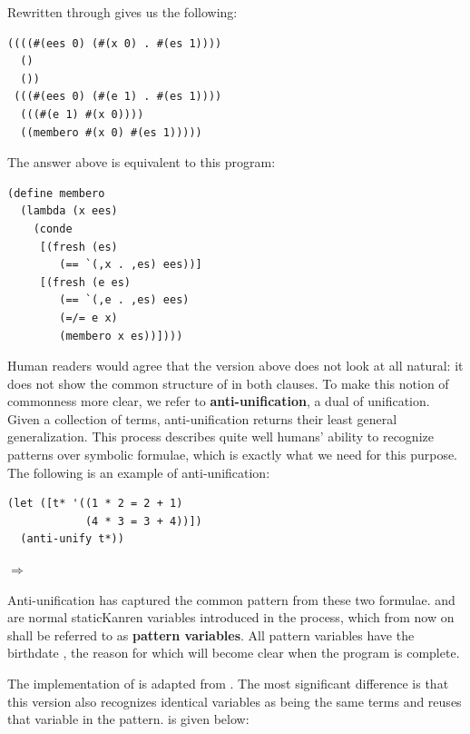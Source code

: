 Rewritten through  gives us the following:
\begin{lstlisting}
((((#(ees 0) (#(x 0) . #(es 1)))) 
  ()
  ())
 (((#(ees 0) (#(e 1) . #(es 1))))
  (((#(e 1) #(x 0))))
  ((membero #(x 0) #(es 1)))))
\end{lstlisting}
The answer above is equivalent to this program:
\begin{lstlisting}
(define membero
  (lambda (x ees)
    (conde
     [(fresh (es)
        (== `(,x . ,es) ees))]
     [(fresh (e es)
        (== `(,e . ,es) ees)
        (=/= e x)
        (membero x es))])))
\end{lstlisting}
Human readers would agree that the version above does not look at all natural: it does not show the common structure of  in both clauses. To make this notion of commonness more clear, we refer to \textbf{anti-unification}, a dual of unification. Given a collection of terms, anti-unification returns their least general generalization. This process describes quite well humans' ability to recognize patterns over symbolic formulae, which is exactly what we need for this purpose. The following is an example of anti-unification:
\begin{lstlisting}
(let ([t* '((1 * 2 = 2 + 1)
            (4 * 3 = 3 + 4))])
  (anti-unify t*))
\end{lstlisting}
$\Rightarrow$ 

Anti-unification has captured the common pattern from these two formulae.  and  are normal staticKanren variables introduced in the process, which from now on shall be referred to as \textbf{pattern variables}. All pattern variables have the birthdate , the reason for which will become clear when the program is complete.

The implementation of  is adapted from \textcite{ostvold2004functional}. The most significant difference is that this version also recognizes identical variables as being the same terms and reuses that variable in the pattern.  is given below:

